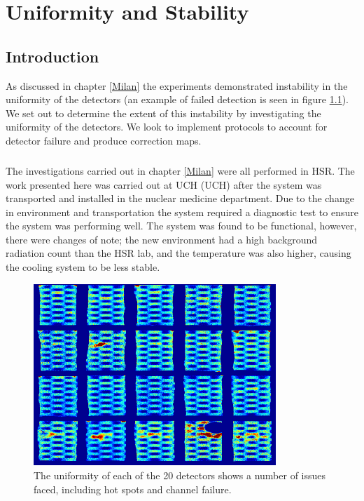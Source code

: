 \chapter{Uniformity and Stability}
\label{Linearity}

\section{Introduction}
As discussed in chapter \ref{Milan} the experiments demonstrated instability in the uniformity of the detectors (an example of failed detection is seen in figure \ref{fig:UniFail}). We set out to determine the extent of this instability by investigating the uniformity of the detectors. We look to implement protocols to account for detector failure and produce correction maps.
\paragraph{}
The investigations carried out in chapter \ref{Milan} were all performed in \acrshort{HSR}. The work presented here was carried out at \acrlong{UCH} (\acrshort{UCH}) after the system was transported and installed in the nuclear medicine department. Due to the change in environment and transportation the system required a diagnostic test to ensure the system was performing well. The system was found to be functional, however, there were changes of note; the new environment had a high background radiation count than the \acrshort{HSR} lab, and the temperature was also higher, causing the cooling system to be less stable. 

\begin{figure}[!t]
\centering
\includegraphics[width=3.6in]{figures/cyl_data.png}

    \caption{The uniformity of each of the 20 detectors shows a number of issues faced, including hot spots and channel failure.} \label{fig:UniFail}
\end{figure}

